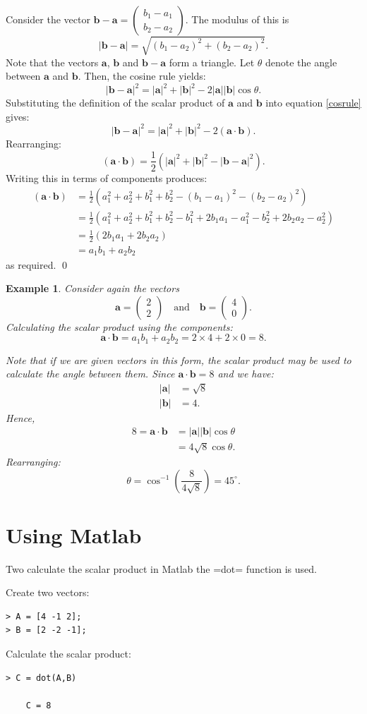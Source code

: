 \documentclass[12pt,a4paper]{article}
\theoremstyle{clearprint}
\renewenvironment{proof}[1][\proofname]
{\noindent{\bf {#1}.}\hspace*{1em}}%
{\qed\par}%
\newtheorem{example}[proposition]{Example}
\newcommand{\bvec}[1]{\mathrm{\mathbf{#1}}}
\newcommand{\cvec}[2]{\begin{pmatrix} #1 \\ #2 \end{pmatrix}}
\newcommand{\vmod}[1]{\lvert #1 \rvert}
\begin{document}
\begin{proof}
Consider the vector \(\bvec{b} - \bvec{a} = \cvec{b_1 - a_1}{b_2 - a_2}\). The modulus of this is
\[
\vmod{\bvec{b} - \bvec{a}} = \sqrt{(b_1 - a_2)^2 + (b_2 - a_2)^2}.
\] 
Note that the vectors \(\bvec{a}\), \(\bvec{b}\) and \(\bvec{b}-\bvec{a}\) form a triangle. Let \(\theta\) denote the angle between \(\bvec{a}\) and \(\bvec{b}\). Then, the cosine rule yields:
\begin{equation}
\label{cosrule}
\vmod{\bvec{b}-\bvec{a}}^2 = \vmod{\bvec{a}}^2 + \vmod{\bvec{b}}^2 - 2\vmod{\bvec{a}}\vmod{\bvec{b}}\cos\theta. 
\end{equation} 
Substituting the definition of the scalar product of \(\bvec{a}\) and \(\bvec{b}\) into equation \ref{cosrule} gives:
\[
\vmod{\bvec{b}-\bvec{a}}^2 = \vmod{\bvec{a}}^2 + \vmod{\bvec{b}}^2 - 2\left(\bvec{a}\cdot \bvec{b}\right).
\] 
Rearranging:
\[
\left(\bvec{a}\cdot \bvec{b}\right) = \frac{1}{2}\left(\vmod{\bvec{a}}^2 + \vmod{\bvec{b}}^2 - \vmod{\bvec{b}-\bvec{a}}^2\right).
\]
Writing this in terms of components produces:
\begin{align*}
\left(\bvec{a}\cdot \bvec{b}\right) &= \frac{1}{2}\left(a_1^2 + a_2^2 + b_1^2 + b_2^2 - (b_1 - a_1)^2 - (b_2 - a_2)^2\right)\\
&=\frac{1}{2}\left(a_1^2 + a_2^2 + b_1^2 + b_2^2 - b_1^2 + 2b_1a_1 - a_1^2 - b_2^2 + 2b_2a_2 - a_2^2\right)\\
&=\frac{1}{2}\left(2b_1a_1 + 2b_2a_2\right)\\
&=a_1b_1 + a_2b_2
\end{align*}
as required. 
\end{proof}

\begin{example}
Consider again the vectors
\[
\bvec{a} = \cvec{2}{2} \quad \text{and} \quad \bvec{b} = \cvec{4}{0}.
\]
Calculating the scalar product using the components:
\[
\bvec{a} \cdot \bvec{b} = a_1b_1 + a_2b_2 = 2\times 4 + 2\times 0 = 8. 
\]

Note that if we are given vectors in this form, the scalar product may be used to calculate the angle between them. Since \(\bvec{a} \cdot \bvec{b} = 8\) and we have:
\begin{align*}
\vmod{\bvec{a}} &= \sqrt{8}\\
\vmod{\bvec{b}} &= 4.
\end{align*}
Hence,
\begin{align*}
8 = \bvec{a} \cdot \bvec{b} &= \vmod{\bvec{a}}\vmod{\bvec{b}}\cos\theta\\
&= 4\sqrt{8}\cos \theta.
\end{align*}
Rearranging:
\[
\theta = \cos^{-1}\left(\frac{8}{4\sqrt{8}}\right) = {45}^{\circ}.
\]
\end{example}

\section{Using Matlab}

Two calculate the scalar product in Matlab the \spverb=dot= function is used. 

Create two vectors:
\begin{lstlisting}
> A = [4 -1 2];
> B = [2 -2 -1];
\end{lstlisting}

Calculate the scalar product:
\begin{lstlisting}
> C = dot(A,B)
    
    C = 8
\end{lstlisting}
\end{document}
